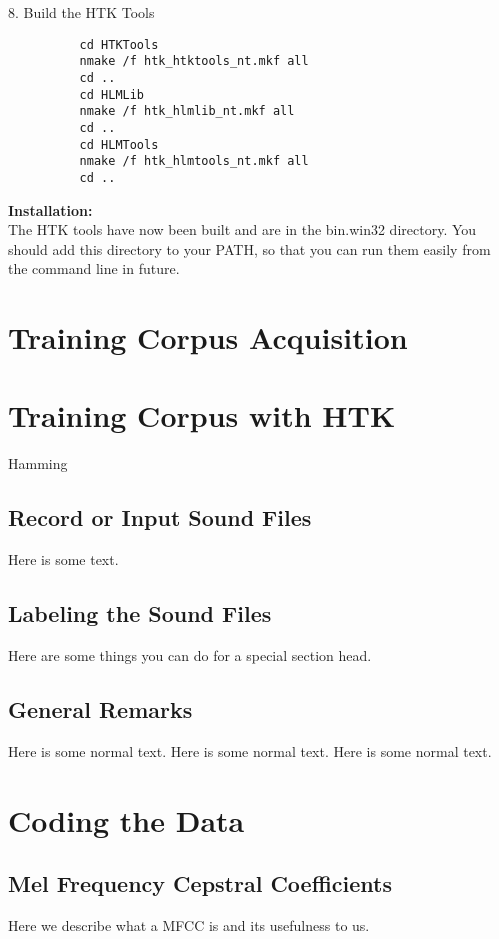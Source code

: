 \documentclass{wileySev}
\begin{document}
   8. Build the HTK Tools
\begin{verbatim}
          cd HTKTools
          nmake /f htk_htktools_nt.mkf all
          cd ..
          cd HLMLib
          nmake /f htk_hlmlib_nt.mkf all
          cd ..
          cd HLMTools
          nmake /f htk_hlmtools_nt.mkf all
          cd ..
\end{verbatim}

\textbf{Installation:}\\
The HTK tools have now been built and are in the bin.win32
directory. You should add this directory to your PATH, so that you can
run them easily from the command line in future.

\chapter{Training Corpus Acquisition}

\chapter{Training Corpus with HTK}

{Hamming \cite{hamming}}


\section{Record or Input Sound Files}
Here is some text.


\section{Labeling the Sound Files}
Here are some things you can do for a special
section head.

\section{General Remarks}
Here is some normal text.
Here is some normal text.
Here is some normal text.



\chapter{Coding the Data}

\section{Mel Frequency Cepstral Coefficients}
Here we describe what a MFCC is and its usefulness to us.
\end{document}
